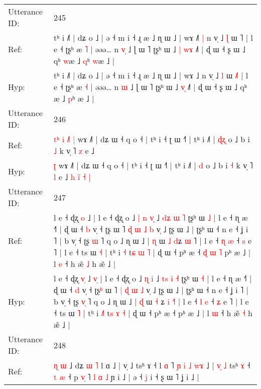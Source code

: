 \documentclass[10pt]{article}
\DeclareRobustCommand{\hl}[1]{{\textcolor{red}{#1}}}
\begin{document}
\begin{longtable}{ll}
 \\
\midrule
Utterance ID: & 245 \\
Ref: & tʰ i ˩˥ | dʑ o ˩ | ə ˧ m i ˧ ɻ æ ˩ ɳ ɯ ˩ | wɤ ˩\hl{˥}\hl{ }\hl{|} n v̩ ˩ \hl{ɭ} ɯ \hl{}˥ | l e ˧ ʈʂʰ æ \hl{˥} | əəə… n \hl{v}\hl{̩} ˩ ɭ ɯ ˥ ʈʂʰ ɯ ˩\hl{ }\hl{|} \hl{w}\hl{ɤ} ˩˥ | ɖ ɯ ˧ ʂ ɯ ˩ qʰ \hl{w}æ ˩ \hl{q}ʰ \hl{w}æ ˩ |
 \\
Hyp: & tʰ i ˩˥ | dʑ o ˩ | ə ˧ m i ˧ ɻ æ ˩ ɳ ɯ ˩ | wɤ ˩\hl{}\hl{}\hl{} n v̩ ˩ \hl{l} ɯ \hl{˩}˥ | l e ˧ ʈʂʰ æ \hl{˧} | əəə… n \hl{}\hl{ɯ} ˩ ɭ ɯ ˥ ʈʂʰ ɯ ˩\hl{}\hl{} \hl{v}\hl{̩} ˩˥ | ɖ ɯ ˧ ʂ ɯ ˩ qʰ \hl{}æ ˩ \hl{p}ʰ \hl{}æ ˩ |
 \\
\midrule
Utterance ID: & 246 \\
Ref: & \hl{t}\hl{ʰ}\hl{ }\hl{i}\hl{ }\hl{˩}\hl{˥}\hl{ }\hl{|} wɤ ˩˥ | dʑ ɯ ˧ q o ˧ | tʰ i ˧ ʈ ɯ ˧˥ | tʰ i ˩˥ | \hl{ɖ}\hl{ʐ} o ˩ b i \hl{˩} k v̩ ˥ \hl{z} e ˩\hl{}\hl{}\hl{}\hl{}\hl{}\hl{}\hl{}\hl{}\hl{}
 \\
Hyp: & \hl{}\hl{}\hl{}\hl{}\hl{}\hl{}\hl{}\hl{}\hl{ʈ} wɤ ˩˥ | dʑ ɯ ˧ q o ˧ | tʰ i ˧ ʈ ɯ ˧˥ | tʰ i ˩˥ | \hl{}\hl{d} o ˩ b i \hl{˧} k v̩ ˥ \hl{l} e ˩\hl{ }\hl{h}\hl{ }\hl{i}\hl{̃}\hl{ }\hl{˧}\hl{ }\hl{|}
 \\
\midrule
Utterance ID: & 247 \\
Ref: & l e ˧ ɖʐ \hl{}\hl{o} ˩\hl{}\hl{}\hl{} | l e ˧ ɖʐ o ˩\hl{ }\hl{|} \hl{n} \hl{v}\hl{̩} ˩ \hl{d}\hl{ʑ} \hl{ɯ} \hl{˥} ʈʂʰ ɯ \hl{˩} | l e ˧ ɳ æ ˧˥ | ɖ ɯ ˧ \hl{b} v̩ ˧ ʈʂ\hl{} ɯ ˥ \hl{ɖ} \hl{ɯ} \hl{˩} \hl{b} v̩ ˩ ʈʂ ɯ ˩ | ʈʂʰ ɯ ˧ n e ˧ ʝ i ˥ | b v̩ ˧ ʈʂ \hl{}\hl{ɯ} ˥ q o ˩ ɳ ɯ ˩ | \hl{ɳ} ɯ \hl{˩} \hl{d}ʑ \hl{ɯ} \hl{}˥ | l e ˧ \hl{ɳ} \hl{æ} ˧ \hl{s} e ˥ | l e ˧ ts ɯ \hl{˧} | tʰ i \hl{}\hl{˧} t\hl{ɕ} \hl{ɯ} \hl{˥} | ɖ ɯ ˧ pʰ æ ˧\hl{ }\hl{ɖ}\hl{ }\hl{ɯ}\hl{ }\hl{˥} pʰ æ ˩ | l \hl{e} ˧ h æ̃ \hl{˩} h æ̃ ˩ |
 \\
Hyp: & l e ˧ ɖʐ \hl{v}\hl{̩} ˩\hl{ }\hl{v}\hl{̩} | l e ˧ ɖʐ o ˩\hl{}\hl{} \hl{ɳ} \hl{}\hl{i} ˩ \hl{t}\hl{s} \hl{i} \hl{˧} ʈʂʰ ɯ \hl{˧} | l e ˧ ɳ æ ˧˥ | ɖ ɯ ˧ \hl{d} v̩ ˧ ʈʂ\hl{ʰ} ɯ ˥ \hl{|} \hl{ɖ} \hl{ɯ} \hl{˩} v̩ ˩ ʈʂ ɯ ˩ | ʈʂʰ ɯ ˧ n e ˧ ʝ i ˥ | b v̩ ˧ ʈʂ \hl{v}\hl{̩} ˥ q o ˩ ɳ ɯ ˩ | \hl{ɖ} ɯ \hl{˧} \hl{}ʑ \hl{i} \hl{˧}˥ | l e ˧ \hl{l} \hl{e} ˧ \hl{ʑ} e ˥ | l e ˧ ts ɯ \hl{˥} | tʰ i \hl{˩}\hl{˥} t\hl{s} \hl{ɤ} \hl{˧} | ɖ ɯ ˧ pʰ æ ˧\hl{}\hl{}\hl{}\hl{}\hl{}\hl{} pʰ æ ˩ | l \hl{ɯ} ˧ h æ̃ \hl{˧} h æ̃ ˩ |
 \\
\midrule
Utterance ID: & 248 \\
Ref: & \hl{ɳ} \hl{ɯ} ˩ dʑ \hl{ɯ} \hl{˥} l ɑ ˩ | v̩ ˩ tsʰ ɤ ˧ l \hl{ɑ} ˥\hl{ }\hl{ɲ} \hl{i} \hl{˩} \hl{w}\hl{ɤ} ˩ |\hl{ }\hl{v}\hl{̩}\hl{ }\hl{˩} tsʰ \hl{ɤ} ˧ \hl{}\hl{t} \hl{æ} ˧ p \hl{v}\hl{̩} ˥\hl{ }\hl{l}\hl{ }\hl{ɑ}\hl{ }\hl{˩} ɲ i ˩ | ə ˧ \hl{j} i ˧ ʂ ɯ ˥ ʝ i ˩ |

\end{longtable}
\end{document}
